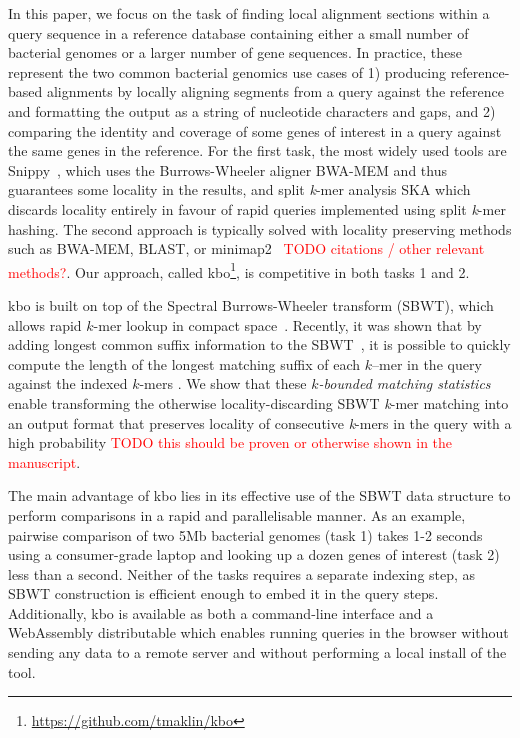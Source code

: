 \documentclass[unnumsec,webpdf,contemporary,large]{oup-authoring-template}%
\theoremstyle{thmstyleone}%
\theoremstyle{thmstyletwo}%
\theoremstyle{thmstylethree}%
\begin{document}
In this paper, we focus on the task of finding local alignment sections within a query sequence in a reference database containing either a small number of bacterial genomes or a larger number of gene sequences. In practice, these represent the two common bacterial genomics use cases of 1) producing reference-based alignments by locally aligning segments from a query against the reference and formatting the output as a string of nucleotide characters and gaps, and 2) comparing the identity and coverage of some genes of interest in a query against the same genes in the reference. For the first task, the most widely used tools are Snippy~\cite{seemann2015snippy}, which uses the Burrows-Wheeler aligner BWA-MEM \cite{li2013aligning} and thus guarantees some locality in the results, and split \emph{k}-mer analysis SKA \cite{derelle2024seamless, harris2018SKA} which discards locality entirely in favour of rapid queries implemented using split \emph{k}-mer hashing. The second approach is typically solved with locality preserving methods such as BWA-MEM, BLAST, or minimap2~\cite{bty191} \textcolor{red}{TODO citations / other relevant methods?}. Our approach, called {\sf kbo}\footnote{\url{https://github.com/tmaklin/kbo}}, is competitive in both tasks 1 and 2.

{\sf kbo} is built on top of the Spectral Burrows-Wheeler transform (SBWT), which allows rapid $k$-mer lookup in compact space~\cite{alanko2023small}. Recently, it was shown that by adding longest common suffix information to the SBWT~\cite{alanko2023longest}, it is possible to quickly compute the length of the longest matching suffix of each $k$–mer in the query against the indexed $k$-mers \cite{alanko2024finimizers}. We show that these \emph{$k$-bounded matching statistics} enable transforming the otherwise locality-discarding SBWT \emph{k}-mer matching into an output format that preserves locality of consecutive \emph{k}-mers in the query with a high probability \textcolor{red}{TODO this should be proven or otherwise shown in the manuscript}. 

The main advantage of {\sf kbo} lies in its effective use of the SBWT data structure to perform comparisons in a rapid and parallelisable manner. As an example, pairwise comparison of two 5Mb bacterial genomes (task 1) takes 1-2 seconds using a consumer-grade laptop and looking up a dozen genes of interest (task 2) less than a second. Neither of the tasks requires a separate indexing step, as SBWT construction is efficient enough to embed it in the query steps. Additionally, {\sf kbo} is available as both a command-line interface and a WebAssembly distributable which enables running queries in the browser without sending any data to a remote server and without performing a local install of the tool.
\end{document}
